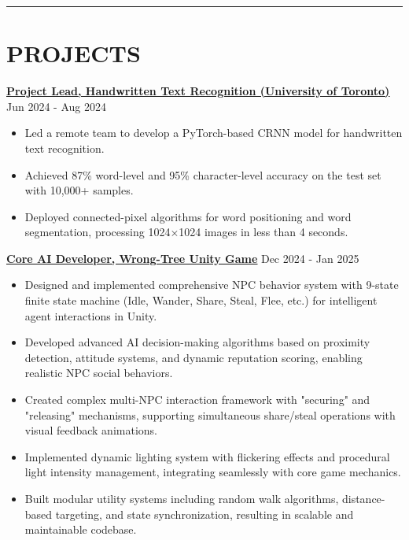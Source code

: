 \documentclass[a4paper,10pt]{article}
\begin{document}
\noindent\rule{\linewidth}{1pt}

\section*{\textbf{PROJECTS}}

\noindent\href{https://github.com/Ken-2511/HandwritingRecognition}{\uline{
\textbf{Project Lead, Handwritten Text Recognition (University of Toronto)}}} \hfill Jun 2024 - Aug 2024
\begin{itemize}[leftmargin=0.2in]
    \item Led a remote team to develop a PyTorch-based CRNN model for handwritten text recognition.
    \item Achieved 87\% word-level and 95\% character-level accuracy on the test set with 10,000+ samples.
    \item Deployed connected-pixel algorithms for word positioning and word segmentation, processing 1024$\times$1024 images in less than 4 seconds.
\end{itemize}

\vspace{0.3cm}
\noindent\href{https://github.com/XiuShw/Wrong-Tree}{\uline{
\textbf{Core AI Developer, Wrong-Tree Unity Game}}} \hfill Dec 2024 - Jan 2025
\begin{itemize}[leftmargin=0.2in]
    \item Designed and implemented comprehensive NPC behavior system with 9-state finite state machine (Idle, Wander, Share, Steal, Flee, etc.) for intelligent agent interactions in Unity.
    \item Developed advanced AI decision-making algorithms based on proximity detection, attitude systems, and dynamic reputation scoring, enabling realistic NPC social behaviors.
    \item Created complex multi-NPC interaction framework with "securing" and "releasing" mechanisms, supporting simultaneous share/steal operations with visual feedback animations.
    \item Implemented dynamic lighting system with flickering effects and procedural light intensity management, integrating seamlessly with core game mechanics.
    \item Built modular utility systems including random walk algorithms, distance-based targeting, and state synchronization, resulting in scalable and maintainable codebase.
\end{itemize}
\end{document}
